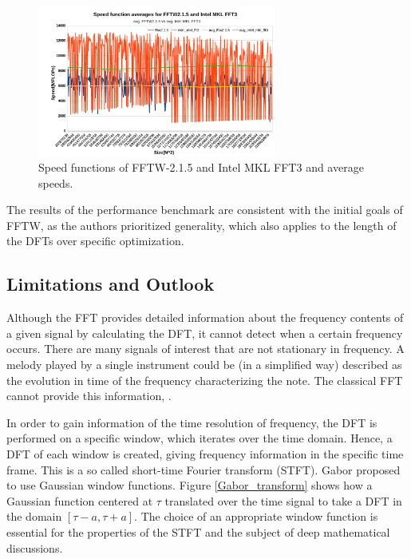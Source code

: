 \documentclass{usiinftr}
\begin{document}
\begin{figure}[h] 
\centering
\includegraphics[width=0.7\textwidth]{figures/MKL_speed.png}
\caption{Speed functions of FFTW-2.1.5 and Intel MKL FFT3 and average speeds\cite{khokhriakov2018novel}. }
\label{MKL_speed}
\end{figure}

The results of the performance benchmark are consistent with the initial goals of FFTW, as the authors prioritized generality, which also applies to the length of the DFTs over specific optimization.

\subsection{Limitations and Outlook}
Although the FFT provides detailed information about the frequency contents of a given signal by calculating the DFT, it cannot detect when a certain frequency occurs.
There are many signals of interest that are not stationary in frequency.
A melody played by a single instrument could be (in a simplified way) described as the evolution in time of the frequency characterizing  the note.
The classical FFT cannot provide this information\cite{brunton_kutz_2019}, \cite{57199}. 

In order to gain information of the time resolution of frequency, the DFT is performed on a specific window, which iterates over the time domain.
Hence, a DFT of each window is created, giving frequency information in the specific time frame.
This is a so called short-time Fourier transform (STFT).
Gabor proposed to use Gaussian window functions.
Figure \ref{Gabor_transform} shows how a Gaussian function centered at $\tau$  translated over the time signal to take a DFT in the domain $[\tau -a, \tau +a]$.
The choice of an appropriate window function is essential for the properties of the STFT and the subject of deep mathematical discussions\cite{57199}.  
\end{document}
